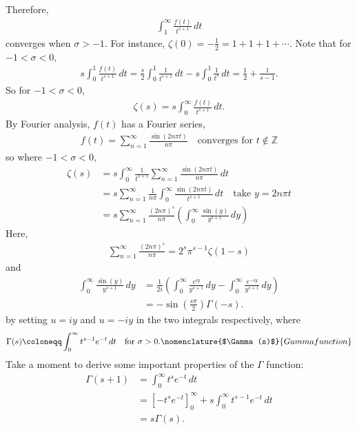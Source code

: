 \documentclass{article}
\newcommand{\1}{\mathbbm{1}}
\begin{document}
Therefore,
\begin{align*}
  \int_1^\infty \frac{f(t)}{t^{s+1}}\,dt
\end{align*}
converges when $\sigma > -1$.
For instance, $\zeta(0) = -\frac{1}{2} = 1 + 1 + 1 + \dotsb$.
Note that for $-1 < \sigma < 0$,
\begin{align*}
  s \int_0^1 \frac{f(t)}{t^{s+1}}\,dt = \frac{s}{2}\int_0^1\frac{1}{t^{s+1}}\,dt - s \int_0^1 \frac{1}{t^s}\,dt = \frac{1}{2} + \frac{1}{s-1}.
\end{align*}
So for $-1 < \sigma < 0$,
\begin{align*}
  \zeta(s) = s \int_0^\infty \frac{f(t)}{t^{s+1}}\,dt.
\end{align*}
By Fourier analysis, $f(t)$ has a Fourier series,
\begin{align*}
  f(t) = \sum_{n=1}^\infty \frac{\sin(2n\pi t)}{n\pi} \quad \text{converges for $t \notin \mathbb Z$}
\end{align*}
so where $-1 < \sigma < 0$,
\begin{align*}
  \zeta(s) &= s \int_0^\infty \frac{1}{t^{s+1}} \sum_{n=1}^\infty \frac{\sin(2n\pi t)}{n\pi}\,dt \\
           &= s \sum_{n=1}^\infty \frac{1}{n\pi} \int_0^\infty \frac{\sin(2n\pi t)}{t^{s+1}}\,dt \quad \text{take $y=2n\pi t$} \\
           &= s \sum_{n=1}^\infty \frac{(2n\pi)^s}{n\pi} (\int_0^\infty \frac{\sin(y)}{y^{s+1}}\,dy)
\end{align*}
Here,
\begin{align*}
  \sum_{n=1}^\infty \frac{(2n\pi)^s}{n\pi} = 2^s \pi^{s-1}\zeta(1-s)
\end{align*}
and
\begin{align*}
  \int_0^\infty \frac{\sin(y)}{y^{s+1}}\,dy &= \frac{1}{2i}\left(\int_0^\infty \frac{e^{iy}}{y^{s+1}}\,dy - \int_0^\infty \frac{e^{-iy}}{y^{s+1}}\,dy\right) \\
                                            &= -\sin(\tfrac{s\pi}{2}) \Gamma(-s).
\end{align*}
by setting $u=iy$ and $u=-iy$ in the two integrals respectively, where
\begin{align*}
  \Gamma(s) \coloneqq \int_0^\infty t^{s-1}e^{-t}\,dt \quad \text{for } \sigma > 0.\nomenclature{$\Gamma(s)$}{Gamma function}
\end{align*}
Take a moment to derive some important properties of the $\Gamma$ function:
\begin{align*}
  \Gamma(s+1)&= \int_0^\infty t^s e^{-t}\,dt \\
             &= [-t^s e^{-t}]_0^\infty + s \int_0^\infty t^{s-1}e^{-t}\,dt \\
             &= s \Gamma(s).
\end{align*}
\end{document}

